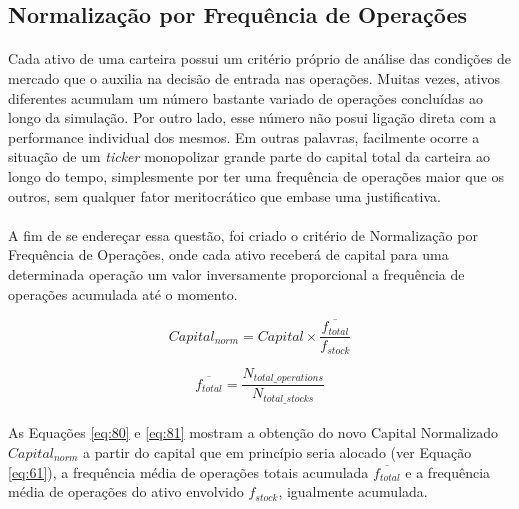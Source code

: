 \subsection{Normalização por Frequência de Operações}
\label{freq_norm}
\paragraph{} Cada ativo de uma carteira possui um critério próprio de análise das condições de mercado que o auxilia na decisão de entrada nas operações. Muitas vezes, ativos diferentes acumulam um número bastante variado de operações concluídas ao longo da simulação. Por outro lado, esse número não posui ligação direta com a performance individual dos mesmos. Em outras palavras, facilmente ocorre a situação de um \textit{ticker} monopolizar grande parte do capital total da carteira ao longo do tempo, simplesmente por ter uma frequência de operações maior que os outros, sem qualquer fator meritocrático que embase uma justificativa.

\paragraph{} A fim de se endereçar essa questão, foi criado o critério de Normalização por Frequência de Operações, onde cada ativo receberá de capital para uma determinada operação um valor inversamente proporcional a frequência de operações acumulada até o momento.

\begin{equation} \label{eq:80}
    Capital_{norm} = Capital \times \dfrac{ \overline{f_{total}} }{ f_{stock}}
\end{equation}

\begin{equation} \label{eq:81}
    \overline{f_{total}} = \dfrac{ N_{total\_operations} }{ N_{total\_stocks} }
\end{equation}

\paragraph{} As Equações \ref{eq:80} e \ref{eq:81} mostram a obtenção do novo Capital Normalizado \begin{math} Capital_{norm} \end{math} a partir do capital que em princípio seria alocado (ver Equação \ref{eq:61}), a frequência média de operações totais acumulada \begin{math} \overline{f_{total}} \end{math} e a frequência média de operações do ativo envolvido \begin{math} f_{stock} \end{math}, igualmente acumulada.

